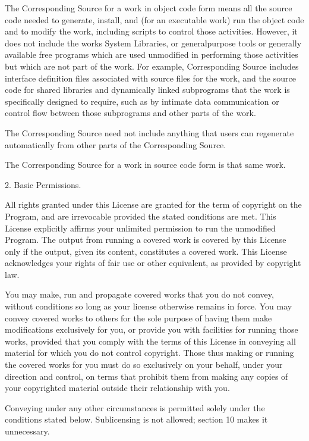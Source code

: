 \documentclass[letterpaper,10pt,english]{sphinxmanual}
\begin{document}
\begin{sphinxVerbatim}[commandchars=\\\{\}]
  The \PYGZdq{}Corresponding Source\PYGZdq{} for a work in object code form means all
the source code needed to generate, install, and (for an executable
work) run the object code and to modify the work, including scripts to
control those activities.  However, it does not include the work\PYGZsq{}s
System Libraries, or general\PYGZhy{}purpose tools or generally available free
programs which are used unmodified in performing those activities but
which are not part of the work.  For example, Corresponding Source
includes interface definition files associated with source files for
the work, and the source code for shared libraries and dynamically
linked subprograms that the work is specifically designed to require,
such as by intimate data communication or control flow between those
subprograms and other parts of the work.

  The Corresponding Source need not include anything that users
can regenerate automatically from other parts of the Corresponding
Source.

  The Corresponding Source for a work in source code form is that
same work.

  2. Basic Permissions.

  All rights granted under this License are granted for the term of
copyright on the Program, and are irrevocable provided the stated
conditions are met.  This License explicitly affirms your unlimited
permission to run the unmodified Program.  The output from running a
covered work is covered by this License only if the output, given its
content, constitutes a covered work.  This License acknowledges your
rights of fair use or other equivalent, as provided by copyright law.

  You may make, run and propagate covered works that you do not
convey, without conditions so long as your license otherwise remains
in force.  You may convey covered works to others for the sole purpose
of having them make modifications exclusively for you, or provide you
with facilities for running those works, provided that you comply with
the terms of this License in conveying all material for which you do
not control copyright.  Those thus making or running the covered works
for you must do so exclusively on your behalf, under your direction
and control, on terms that prohibit them from making any copies of
your copyrighted material outside their relationship with you.

  Conveying under any other circumstances is permitted solely under
the conditions stated below.  Sublicensing is not allowed; section 10
makes it unnecessary.


\end{sphinxVerbatim}
\end{document}
